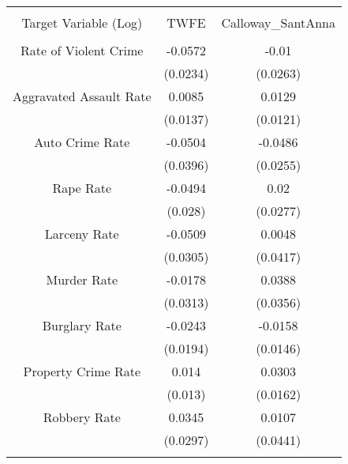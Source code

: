 
\begin{table}[!htbp] \centering 
  \caption{} 
  \label{} 
\begin{tabular}{@{\extracolsep{5pt}} ccc} 
\\[-1.8ex]\hline 
\hline \\[-1.8ex] 
Target Variable (Log) & TWFE & Calloway\_SantAnna \\ 
\hline \\[-1.8ex] 
Rate of Violent Crime & -0.0572 & -0.01 \\ 
 & (0.0234) & (0.0263) \\ 
Aggravated Assault Rate & 0.0085 & 0.0129 \\ 
 & (0.0137) & (0.0121) \\ 
Auto Crime Rate & -0.0504 & -0.0486 \\ 
 & (0.0396) & (0.0255) \\ 
Rape Rate & -0.0494 & 0.02 \\ 
 & (0.028) & (0.0277) \\ 
Larceny Rate & -0.0509 & 0.0048 \\ 
 & (0.0305) & (0.0417) \\ 
Murder Rate & -0.0178 & 0.0388 \\ 
 & (0.0313) & (0.0356) \\ 
Burglary Rate & -0.0243 & -0.0158 \\ 
 & (0.0194) & (0.0146) \\ 
Property Crime Rate & 0.014 & 0.0303 \\ 
 & (0.013) & (0.0162) \\ 
Robbery Rate & 0.0345 & 0.0107 \\ 
 & (0.0297) & (0.0441) \\ 
\hline \\[-1.8ex] 
\end{tabular} 
\end{table} 
